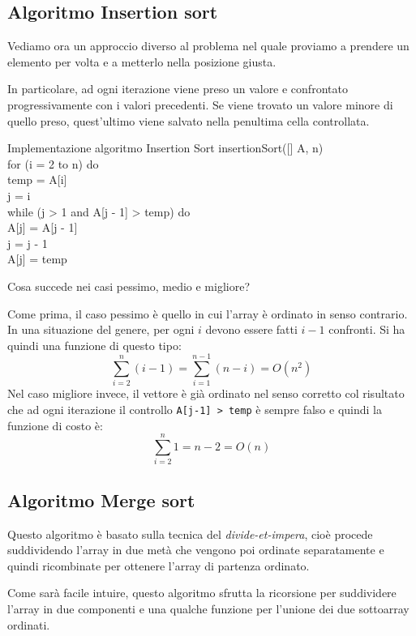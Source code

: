 \subsection{Algoritmo Insertion sort}
Vediamo ora un approccio diverso al problema nel quale proviamo a prendere un
elemento per volta e a metterlo nella posizione giusta.

In particolare, ad ogni iterazione viene preso un valore e confrontato
progressivamente con i valori precedenti. Se viene trovato un valore minore di
quello preso, quest'ultimo viene salvato nella penultima cella
controllata.
\begin{code}{Implementazione algoritmo Insertion Sort}
\noindent\rmbreak\ind insertionSort([] A,  n)\\
    for (i = 2 to n) do\\
        \indf {} temp = A[i]\\
         j = i\\
        while (j > 1 and A[j - 1] > temp) do\\
            \indff A[j] = A[j - 1]\\
            j = j - 1\\
        \indf A[j] = temp
\end{code}\noindent
Cosa succede nei casi pessimo, medio e migliore?

\bigskip\noindent
Come prima, il caso pessimo è quello in cui l'array è ordinato in senso
contrario. In una situazione del genere, per ogni $i$ devono essere fatti $i-1$
confronti. Si ha quindi una funzione di questo tipo:
\[\sum_{i=2}^n(i-1)=\sum_{i=1}^{n-1}(n-i)=O(n^2)\]
Nel caso migliore invece, il vettore è già ordinato nel senso corretto col
risultato che ad ogni iterazione il controllo \texttt{A[j-1] > temp} è sempre
falso e quindi la funzione di costo è:
\[\sum_{i=2}^n1=n-2=O(n)\]

\hypertarget{sec:merge_sort}{\subsection{Algoritmo Merge sort}}
Questo algoritmo è basato sulla tecnica del \emph{divide-et-impera}, cioè procede
suddividendo l'array in due metà che vengono poi ordinate separatamente e quindi
ricombinate per ottenere l'array di partenza ordinato.

Come sarà facile intuire, questo algoritmo sfrutta la ricorsione per suddividere
l'array in due componenti e una qualche funzione per l'unione dei due sottoarray
ordinati.

